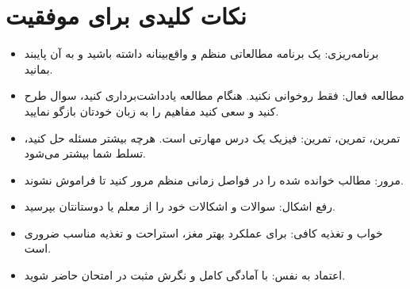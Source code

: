 \documentclass[12pt]{article}
\begin{document}
\section{نکات کلیدی برای موفقیت}
\begin{itemize}
    \item برنامه‌ریزی: یک برنامه مطالعاتی منظم و واقع‌بینانه داشته باشید و به آن پایبند بمانید.
    \item مطالعه فعال: فقط روخوانی نکنید. هنگام مطالعه یادداشت‌برداری کنید، سوال طرح کنید و سعی کنید مفاهیم را به زبان خودتان بازگو نمایید.
    \item تمرین، تمرین، تمرین: فیزیک یک درس مهارتی است. هرچه بیشتر مسئله حل کنید، تسلط شما بیشتر می‌شود.
    \item مرور: مطالب خوانده شده را در فواصل زمانی منظم مرور کنید تا فراموش نشوند.
    \item رفع اشکال: سوالات و اشکالات خود را از معلم یا دوستانتان بپرسید.
    \item خواب و تغذیه کافی: برای عملکرد بهتر مغز، استراحت و تغذیه مناسب ضروری است.
    \item اعتماد به نفس: با آمادگی کامل و نگرش مثبت در امتحان حاضر شوید.
\end{itemize}
\end{document}
